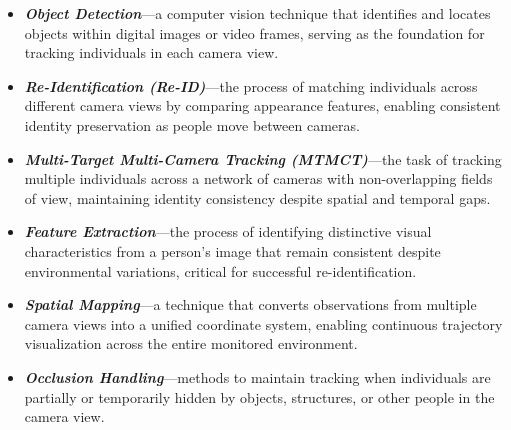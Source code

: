 \begin{itemize}[leftmargin=40pt]
    \item \textbf{\textit{Object Detection}}---a computer vision technique that identifies and locates objects within digital images or video frames, serving as the foundation for tracking individuals in each camera view.
    \item \textbf{\textit{Re-Identification (Re-ID)}}---the process of matching individuals across different camera views by comparing appearance features, enabling consistent identity preservation as people move between cameras.
    \item \textbf{\textit{Multi-Target Multi-Camera Tracking (MTMCT)}}---the task of tracking multiple individuals across a network of cameras with non-overlapping fields of view, maintaining identity consistency despite spatial and temporal gaps.
    \item \textbf{\textit{Feature Extraction}}---the process of identifying distinctive visual characteristics from a person's image that remain consistent despite environmental variations, critical for successful re-identification.
    \item \textbf{\textit{Spatial Mapping}}---a technique that converts observations from multiple camera views into a unified coordinate system, enabling continuous trajectory visualization across the entire monitored environment.
    \item \textbf{\textit{Occlusion Handling}}---methods to maintain tracking when individuals are partially or temporarily hidden by objects, structures, or other people in the camera view.
\end{itemize}